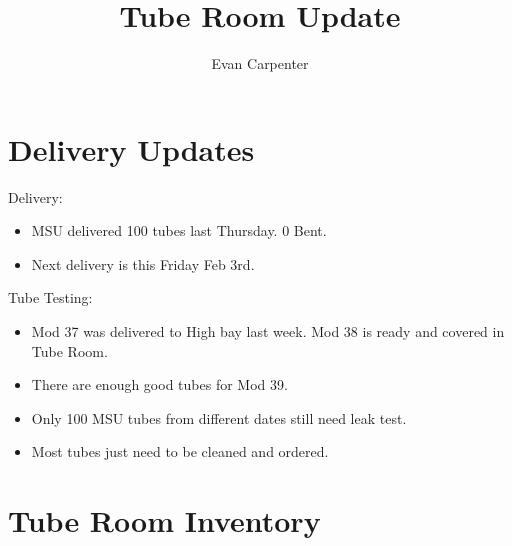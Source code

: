 \documentclass{beamer}
\title{Tube Room Update}
\author{Evan Carpenter}
\begin{document}
\titlepage
\section{Delivery Updates}
	\begin{frame}
		\begin{block}{Delivery:}
			\begin{itemize}
				\item \small MSU delivered 100 tubes last Thursday. 0 Bent. 
				\item Next delivery is this Friday Feb 3rd.
			\end{itemize}
		\end{block}	
		\begin{block}{Tube Testing:}
			\begin{itemize}
				\item Mod 37 was delivered to High bay last week. Mod 38 is ready and covered in Tube Room. 
				\item There are enough good tubes for Mod 39.
				\item Only 100 MSU tubes from different dates still need leak test. 
				\item Most tubes just need to be cleaned and ordered. 
			\end{itemize}
		\end{block}
	\end{frame}


\section{Tube Room Inventory}
\end{document}
